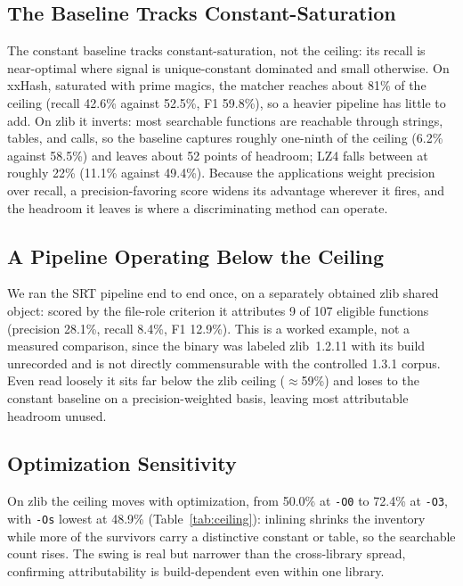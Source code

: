 \documentclass[conference]{IEEEtran}
\begin{document}
\subsection{The Baseline Tracks Constant-Saturation}
The constant baseline tracks constant-saturation, not the ceiling: its recall is
near-optimal where signal is unique-constant dominated and small otherwise. On xxHash,
saturated with prime magics, the matcher reaches about 81\% of the ceiling (recall
42.6\% against 52.5\%, F1 59.8\%), so a heavier pipeline has little to add. On zlib it
inverts: most searchable functions are reachable through strings, tables, and calls, so
the baseline captures roughly one-ninth of the ceiling (6.2\% against 58.5\%) and leaves
about 52 points of headroom; LZ4 falls between at roughly 22\% (11.1\% against 49.4\%).
Because the applications weight precision over recall, a precision-favoring score widens
its advantage wherever it fires, and the headroom it leaves is where a discriminating
method can operate.

\subsection{A Pipeline Operating Below the Ceiling}
We ran the SRT pipeline end to end once, on a separately obtained zlib shared object:
scored by the file-role criterion it attributes 9 of 107 eligible functions (precision
28.1\%, recall 8.4\%, F1 12.9\%). This is a worked example, not a measured comparison,
since the binary was labeled zlib~1.2.11 with its build unrecorded and is not directly
commensurable with the controlled 1.3.1 corpus. Even read loosely it sits far below the
zlib ceiling ($\approx$59\%) and loses to the constant baseline on a precision-weighted
basis, leaving most attributable headroom unused.

\subsection{Optimization Sensitivity}
On zlib the ceiling moves with optimization, from 50.0\% at \texttt{-O0} to 72.4\% at
\texttt{-O3}, with \texttt{-Os} lowest at 48.9\% (Table~\ref{tab:ceiling}): inlining
shrinks the inventory while more of the survivors carry a distinctive constant or table,
so the searchable count rises. The swing is real but narrower than the cross-library
spread, confirming attributability is build-dependent even within one library.
\end{document}
